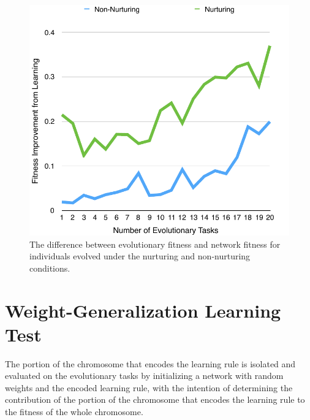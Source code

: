 \documentclass[master]{outhesis}
\begin{document}
\begin{figure}[H]
	\centering
	\includegraphics{LearningImprovementPlot.pdf}
	\caption{The difference between evolutionary fitness and network fitness for individuals evolved under the nurturing and non-nurturing conditions.}
	\label{fig:LearningImprovement}
\end{figure}

\section{Weight-Generalization Learning Test}

The portion of the chromosome that encodes the learning rule is isolated and evaluated on the evolutionary tasks by initializing a network with random weights and the encoded learning rule, with the intention of determining the contribution of the portion of the chromosome that encodes the learning rule to the fitness of the whole chromosome.
\end{document}
